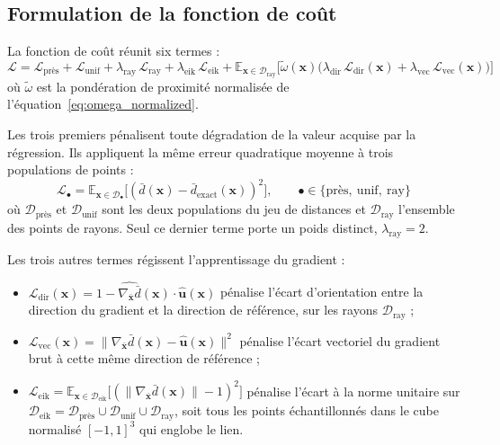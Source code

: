 \subsection*{Formulation de la fonction de coût}

La fonction de coût réunit six termes :
\begin{equation}\label{eq:sdf_refinement_loss_details}
  \mathcal{L} = \mathcal{L}_{\text{près}} + \mathcal{L}_{\mathrm{unif}} + \lambda_{\mathrm{ray}}\,\mathcal{L}_{\mathrm{ray}}
  + \lambda_{\mathrm{eik}}\,\mathcal{L}_{\mathrm{eik}}
  + \mathbb{E}_{\mathbf{x} \in \mathcal{D}_{\mathrm{ray}}}\Big[\tilde{\omega}(\mathbf{x})\big(\lambda_{\mathrm{dir}}\,\mathcal{L}_{\mathrm{dir}}(\mathbf{x}) + \lambda_{\mathrm{vec}}\,\mathcal{L}_{\mathrm{vec}}(\mathbf{x})\big)\Big]
\end{equation}
où $\tilde{\omega}$ est la pondération de proximité normalisée de l'équation~\eqref{eq:omega_normalized}.

Les trois premiers pénalisent toute dégradation de la valeur acquise par la régression. Ils appliquent la même erreur quadratique moyenne à trois populations de points :
\begin{equation}\label{eq:sdf_value_terms}
  \mathcal{L}_{\bullet} = \mathbb{E}_{\mathbf{x} \in \mathcal{D}_{\bullet}} \big[ (\bar{d}(\mathbf{x}) - \bar{d}_{\text{exact}}(\mathbf{x}))^2 \big],
  \qquad \bullet \in \{\text{près},\ \mathrm{unif},\ \mathrm{ray}\}
\end{equation}
où $\mathcal{D}_{\text{près}}$ et $\mathcal{D}_{\mathrm{unif}}$ sont les deux populations du jeu de distances et $\mathcal{D}_{\mathrm{ray}}$ l'ensemble des points de rayons. Seul ce dernier terme porte un poids distinct, $\lambda_{\mathrm{ray}} = 2$.

Les trois autres termes régissent l'apprentissage du gradient :
\begin{itemize}
  \item $\mathcal{L}_{\mathrm{dir}}(\mathbf{x}) = 1 - \widehat{\nabla_{\bar{\mathbf{x}}} \bar{d}}(\mathbf{x}) \cdot \hat{\mathbf{u}}(\mathbf{x})$ pénalise l'écart d'orientation entre la direction du gradient et la direction de référence, sur les rayons $\mathcal{D}_{\mathrm{ray}}$ ;
  \item $\mathcal{L}_{\mathrm{vec}}(\mathbf{x}) = \|\nabla_{\bar{\mathbf{x}}} \bar{d}(\mathbf{x}) - \hat{\mathbf{u}}(\mathbf{x})\|^2$ pénalise l'écart vectoriel du gradient brut à cette même direction de référence ;
  \item $\mathcal{L}_{\mathrm{eik}} = \mathbb{E}_{\mathbf{x} \in \mathcal{D}_{\mathrm{eik}}} \big[ (\|\nabla_{\bar{\mathbf{x}}}\bar{d}(\mathbf{x})\| - 1)^2 \big]$ pénalise l'écart à la norme unitaire sur $\mathcal{D}_{\mathrm{eik}} = \mathcal{D}_{\text{près}} \cup \mathcal{D}_{\mathrm{unif}} \cup \mathcal{D}_{\mathrm{ray}}$, soit tous les points échantillonnés dans le cube normalisé $[-1,1]^3$ qui englobe le lien.
\end{itemize}


